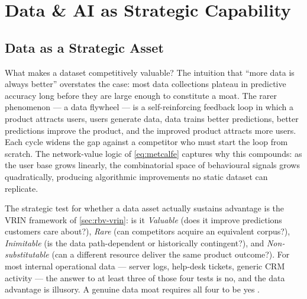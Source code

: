 \chapter{Data \& AI as Strategic Capability}\label{ch:data-and-ai-strategy}


\section{Data as a Strategic Asset}\label{sec:data-asset}

What makes a dataset competitively valuable? The intuition that ``more data is always better''
overstates the case: most data collections plateau in predictive accuracy long before they are
large enough to constitute a moat. The rarer phenomenon — a data flywheel — is a self-reinforcing
feedback loop in which a product attracts users, users generate data, data trains better predictions,
better predictions improve the product, and the improved product attracts more users. Each cycle
widens the gap against a competitor who must start the loop from scratch. The network-value logic
of \cref{eq:metcalfe} captures why this compounds: as the user base grows linearly, the combinatorial
space of behavioural signals grows quadratically, producing algorithmic improvements no static
dataset can replicate.

The strategic test for whether a data asset actually sustains advantage is the VRIN framework of
\cref{sec:rbv-vrin}: is it \emph{Valuable} (does it improve predictions customers care about?),
\emph{Rare} (can competitors acquire an equivalent corpus?), \emph{Inimitable} (is the data
path-dependent or historically contingent?), and \emph{Non-substitutable} (can a different
resource deliver the same product outcome?). For most internal operational data — server logs,
help-desk tickets, generic CRM activity — the answer to at least three of those four tests is no,
and the data advantage is illusory. A genuine data moat requires all four to be yes
\parencite{agrawal2018prediction}.

